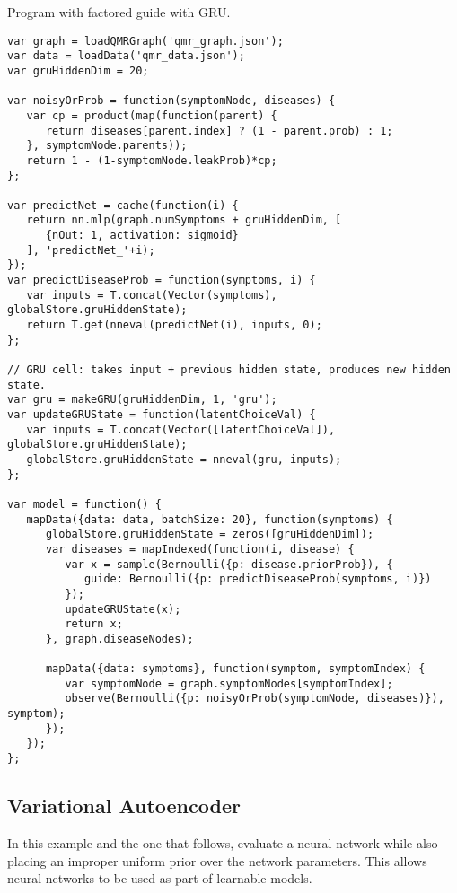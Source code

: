 Program with factored guide with GRU.
\begin{lstlisting}
var graph = loadQMRGraph('qmr_graph.json');
var data = loadData('qmr_data.json');
var gruHiddenDim = 20;

var noisyOrProb = function(symptomNode, diseases) {
   var cp = product(map(function(parent) {
      return diseases[parent.index] ? (1 - parent.prob) : 1;
   }, symptomNode.parents));
   return 1 - (1-symptomNode.leakProb)*cp;
};

var predictNet = cache(function(i) {
   return nn.mlp(graph.numSymptoms + gruHiddenDim, [
      {nOut: 1, activation: sigmoid}
   ], 'predictNet_'+i);
});
var predictDiseaseProb = function(symptoms, i) {
   var inputs = T.concat(Vector(symptoms), globalStore.gruHiddenState);
   return T.get(nneval(predictNet(i), inputs, 0);
};

// GRU cell: takes input + previous hidden state, produces new hidden state.
var gru = makeGRU(gruHiddenDim, 1, 'gru');
var updateGRUState = function(latentChoiceVal) {
   var inputs = T.concat(Vector([latentChoiceVal]), globalStore.gruHiddenState);
   globalStore.gruHiddenState = nneval(gru, inputs);
};

var model = function() {
   mapData({data: data, batchSize: 20}, function(symptoms) {
      globalStore.gruHiddenState = zeros([gruHiddenDim]);
      var diseases = mapIndexed(function(i, disease) {
         var x = sample(Bernoulli({p: disease.priorProb}), {
            guide: Bernoulli({p: predictDiseaseProb(symptoms, i)})
         });
         updateGRUState(x);
         return x;
      }, graph.diseaseNodes);

      mapData({data: symptoms}, function(symptom, symptomIndex) {
         var symptomNode = graph.symptomNodes[symptomIndex];
         observe(Bernoulli({p: noisyOrProb(symptomNode, diseases)}), symptom);
      });
   });
};
\end{lstlisting}

\subsection{Variational Autoencoder}
\label{sec:appendix_code:vae}

In this example and the one that follows,  evaluate a neural network while also placing an improper uniform prior over the network parameters. This allows neural networks to be used as part of learnable models.

